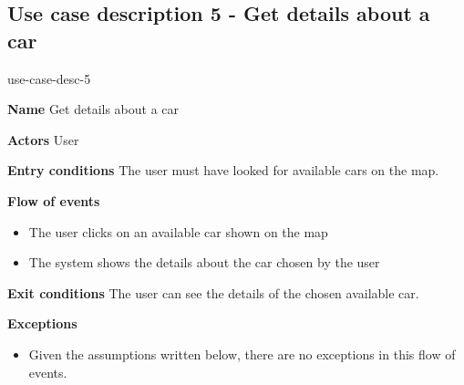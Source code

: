 \subsection{Use case description 5 - Get details about a car}
\begin{labeling}{use-case-desc-5}
	\item[\textbf{Name}] Get details about a car
	\item[\textbf{Actors}] User
	\item[\textbf{Entry conditions}] The user must have looked for available cars on the map.
	\item[\textbf{Flow of events}]
		\begin{itemize}
			\item[]
			\item The user clicks on an available car shown on the map
			\item The system shows the details about the car chosen by the user
		\end{itemize}
	\item[\textbf{Exit conditions}] The user can see the details of the chosen available car.
	\item[\textbf{Exceptions}]
		\begin{itemize}
			\item[]
			\item Given the assumptions written below, there are no exceptions in this flow of events.
		\end{itemize}
\end{labeling}

